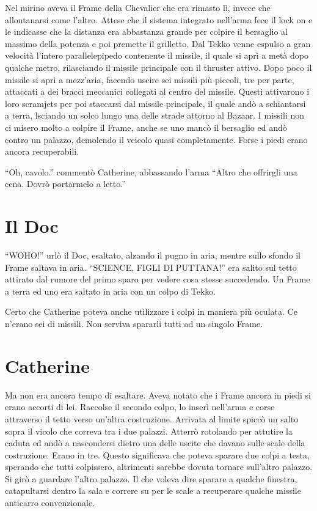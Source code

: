     Nel mirino aveva il Frame della Chevalier che era rimasto lì, invece che allontanarsi come l'altro. Attese che il
    sistema integrato nell'arma fece il lock on e le indicasse che la distanza era abbastanza grande per colpire il
    bersaglio al massimo della potenza e poi premette il grilletto. Dal Tekko venne espulso a gran velocità l'intero
    parallelepipedo contenente il missile, il quale si aprì a metà dopo qualche metro, rilasciando il missile
    principale con il thruster attivo. Dopo poco il missile si aprì a mezz'aria, facendo uscire sei missili più piccoli,
    tre per parte, attaccati a dei bracci meccanici collegati al centro del missile. Questi attivarono i loro scramjets
    per poi staccarsi dal missile principale, il quale andò a schiantarsi a terra, lsciando un solco lungo una delle
    strade attorno al Bazaar. I missili non ci misero molto a colpire il Frame, anche se uno mancò il bersaglio ed andò
    contro un palazzo, demolendo il veicolo quasi completamente. Forse i piedi erano ancora recuperabili.

    ``Oh, cavolo.'' commentò Catherine, abbassando l'arma ``Altro che offrirgli una cena. Dovrò portarmelo a letto.''

  \section*{Il Doc}

    ``WOHO!'' urlò il Doc, esaltato, alzando il pugno in aria, mentre sullo sfondo il Frame saltava in aria. ``SCIENCE, FIGLI DI
    PUTTANA!'' era salito sul tetto attirato dal rumore del primo sparo per vedere cosa stesse succedendo. Un Frame a
    terra ed uno era saltato in aria con un colpo di Tekko.

    Certo che Catherine poteva anche utilizzare i colpi in maniera più oculata. Ce n'erano sei di missili. Non serviva
    spararli tutti ad un singolo Frame.

  \section*{Catherine}

    Ma non era ancora tempo di esaltare. Aveva notato che i Frame ancora in piedi si erano accorti di lei. Raccolse il
    secondo colpo, lo inserì nell'arma e corse attraverso il tetto verso un'altra costruzione. Arrivata al limite spiccò
    un salto sopra il vicolo che correva tra i due palazzi. Atterrò rotolando per attutire la caduta ed andò a
    nascondersi dietro una delle uscite che davano sulle scale della costruzione. Erano in tre. Questo significava che
    poteva sparare due colpi a testa, sperando che tutti colpissero, altrimenti sarebbe dovuta tornare sull'altro
    palazzo. Si girò a guardare l'altro palazzo. Il che voleva dire sparare a qualche finestra, catapultarsi dentro la
    sala e correre su per le scale a recuperare qualche missile anticarro convenzionale.

